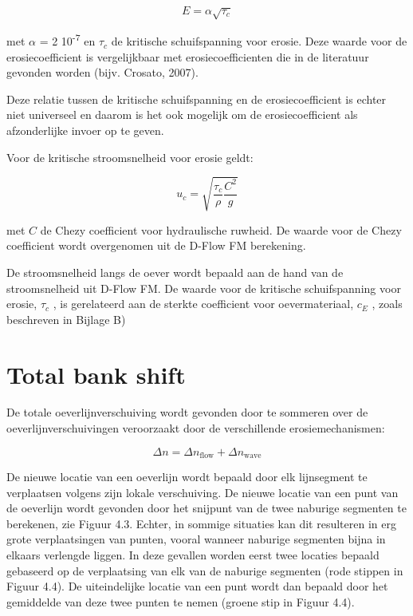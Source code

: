 \begin{equation}
E = \alpha \sqrt{\tau_c}
\end{equation}

met $\alpha$ = 2 10\textsuperscript{-7}  en $\tau_c$  de kritische schuifspanning voor erosie.
Deze waarde voor de erosiecoefficient is vergelijkbaar met erosiecoefficienten die in de literatuur gevonden worden (bijv.
Crosato, 2007).

Deze relatie tussen de kritische schuifspanning en de erosiecoefficient is echter niet universeel en daarom is het ook mogelijk om de erosiecoefficient als afzonderlijke invoer op te geven.

Voor de kritische stroomsnelheid voor erosie geldt:

\begin{equation}
u_c = \sqrt{\frac{\tau_c}{\rho} \frac{C^2}{g}}
\end{equation}

met $C$  de Chezy coefficient voor hydraulische ruwheid.
De waarde voor de Chezy coefficient wordt overgenomen uit de D-Flow FM berekening.

De stroomsnelheid langs de oever wordt bepaald aan de hand van de stroomsnelheid uit D-Flow FM.
De waarde voor de kritische schuifspanning voor erosie, $\tau_c$ , is gerelateerd aan de sterkte coefficient voor oevermateriaal, $c_E$ , zoals beschreven in Bijlage B)

\section{Total bank shift}

De totale oeverlijnverschuiving wordt gevonden door te sommeren over de oeverlijnverschuivingen veroorzaakt door de verschillende erosiemechanismen:

\begin{equation}
\Delta n = \Delta n_\text{flow} + \Delta n_\text{wave}
\end{equation}

De nieuwe locatie van een oeverlijn wordt bepaald door elk lijnsegment te verplaatsen volgens zijn lokale verschuiving.
De nieuwe locatie van een punt van de oeverlijn wordt gevonden door het snijpunt van de twee naburige segmenten te berekenen, zie Figuur 4.3.
Echter, in sommige situaties kan dit resulteren in erg grote verplaatsingen van punten, vooral wanneer naburige segmenten bijna in elkaars verlengde liggen.
In deze gevallen worden eerst twee locaties bepaald gebaseerd op de verplaatsing van elk van de naburige segmenten (rode stippen in Figuur 4.4).
De uiteindelijke locatie van een punt wordt dan bepaald door het gemiddelde van deze twee punten te nemen (groene stip in Figuur 4.4).


